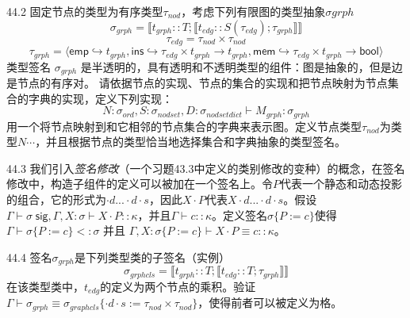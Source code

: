 44.2 固定节点的类型为有序类型$\tau_{nod}$，考虑下列有限图的类型抽象$\sigma{grph}$
$$\sigma_{grph} = \llbracket t_{grph}::T;\llbracket t_{edg}::S(\tau_{edg});\tau_{grph}\rrbracket \rrbracket $$
$$\tau_{edg} = \tau_{nod} \times \tau_{nod}$$
$$\tau_{grph} = \langle \mathsf{emp} \hookrightarrow t_{grph},\mathsf{ins} \hookrightarrow \tau_{edg} \times t_{grph} \rightarrow t_{grph},\mathsf{mem} \hookrightarrow \tau_{edg} \times t_{grph} \rightarrow \mathsf{bool}\rangle$$
类型签名 $\sigma_{grph}$ 是半透明的，具有透明和不透明类型的组件：图是抽象的，但是边是节点的有序对。
请依据节点的实现、节点的集合的实现和把节点映射为节点集合的字典的实现，定义下列实现：
$$N:\sigma_{ord},S:\sigma_{nodset},D:\sigma_{nodsetdict}\vdash M_{grph}:\sigma_{grph}$$
用一个将节点映射到和它相邻的节点集合的字典来表示图。定义节点类型$\tau_{nod}$为类型$N\cdots$，并且根据节点的类型恰当地选择集合和字典抽象的类型签名。


44.3 我们引入\textit{签名修改}（一个习题43.3中定义的类别修改的变种）的概念，在签名修改中，构造子组件的定义可以被加在一个签名上。令$P$代表一个静态和动态投影的组合，它的形式为$\cdot d ...\cdot d\cdot s$，因此$X \cdot P$代表$X\cdot d... \cdot d \cdot s$。假设$\Gamma \vdash \sigma \;\mathsf{sig},\Gamma,X:\sigma \vdash X \cdot P::\kappa$，并且$\Gamma \vdash c::\kappa$。定义签名$\sigma \{P:=c\}$使得$\Gamma \vdash \sigma\{P:=c\} <: \sigma$ 并且 $\Gamma,X:\sigma\{P:=c\} \vdash X\cdot P \equiv c::\kappa$。


44.4 签名$\sigma_{grph}$是下列类型类的子签名（实例）$$\sigma_{grphcls} = \llbracket t_{grph}::T;\llbracket t_{edg}::T;\tau_{grph}\rrbracket \rrbracket$$
在该类型类中，$t_{edg}$的定义为两个节点的乘积。验证$\Gamma \vdash \sigma_{grph} \equiv \sigma_{graphcls}\{\cdot d\cdot s := \tau_{nod} \times \tau_{nod} \}$，使得前者可以被定义为格。
